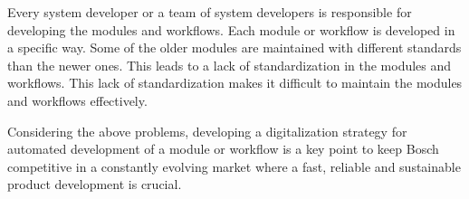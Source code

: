 Every system developer or a team of system developers is responsible for developing the modules and workflows. Each module or workflow is developed in a 
specific way. Some of the older modules are maintained with different standards than the newer ones. This leads to a lack of standardization 
in the modules and workflows. This lack of standardization makes it difficult to maintain the modules and workflows 
effectively.\newline

Considering the above problems, developing a digitalization strategy for automated development of a module or workflow is a key point to keep Bosch competitive 
in a constantly evolving market where a fast, reliable and sustainable product development is crucial.